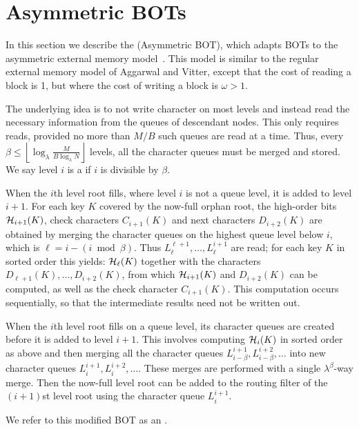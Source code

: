 \section{Asymmetric BOTs}\label{sec:boa-asymmetric}

In this section we describe the  (Asymmetric BOT), which adapts BOTs to the asymmetric external memory
model~\cite{DBLP:conf/spaa/BlellochFGGS15}. This model is similar to the
regular external memory model of Aggarwal and Vitter, except that the cost of
reading a block is 1, but where the cost of writing a block is $\omega>1$.

The underlying idea is to not write character on most levels and instead read
the necessary information from the queues of descendant nodes. This only
requires reads, provided no more than $M/B$ such queues are read at a time.
Thus, every $\beta \leq \left\lfloor\log_\lambda\frac{M}{B\log_\lambda
N}\right\rfloor$ levels, all the character queues must be merged and stored. We
say level $i$ is a  if $i$ is divisible by $\beta$.

When the $i$th level root fills, where level $i$ is not a queue level, it is
added to level $i+1$. For each key $K$ covered by the now-full orphan root, the
high-order bits $\mathcal{H}_{i+1}(K)$, check characters $C_{i+1}(K)$ and next
characters $D_{i+2}(K)$ are obtained by merging the character queues on the
highest queue level below $i$, which is $\ell=i - \left(i\bmod\beta\right)$.
Thus $L_\ell^{\ell + 1},\ldots, L_\ell^{i + 1}$ are read;  for each key $K$ in
sorted order this yields: $\mathcal{H}_{\ell}(K)$ together with the characters
$D_{\ell + 1}(K),\ldots,D_{i+2}(K)$, from which $\mathcal{H}_{i+1}(K)$ and
$D_{i+2}(K)$ can be computed, as well as the check character $C_{i+1}(K)$. This
computation occurs sequentially, so that the intermediate results need not be
written out.

When the $i$th level root fills on a queue level, its character queues are
created before it is added to level $i+1$. This involves computing
$\mathcal{H}_{i}(K)$ in sorted order as above and then merging all the character
queues $L_{i-\beta}^{i+1},L_{i-\beta}^{i+2},\ldots$ into new character queues
$L_i^{i+1},L_i^{i+2},\ldots$. These merges are performed with a single
$\lambda^\beta$-way merge. Then the now-full level root can be added to the
routing filter of the $(i+1)$st level root using the character queue
$L_i^{i+1}$.

We refer to this modified BOT as an . 

